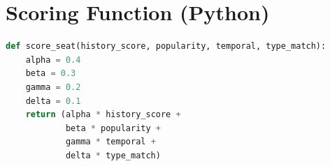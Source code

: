 \documentclass[12pt,a4paper]{report} %
\begin{document}
\section*{Scoring Function (Python)}
\label{appendix:scoring}

\begin{lstlisting}[language=Python, caption=Seat Scoring Function (Python), label=lst:scoring-function]
def score_seat(history_score, popularity, temporal, type_match):
    alpha = 0.4
    beta = 0.3
    gamma = 0.2
    delta = 0.1
    return (alpha * history_score +
            beta * popularity +
            gamma * temporal +
            delta * type_match)
\end{lstlisting}



\end{document}
